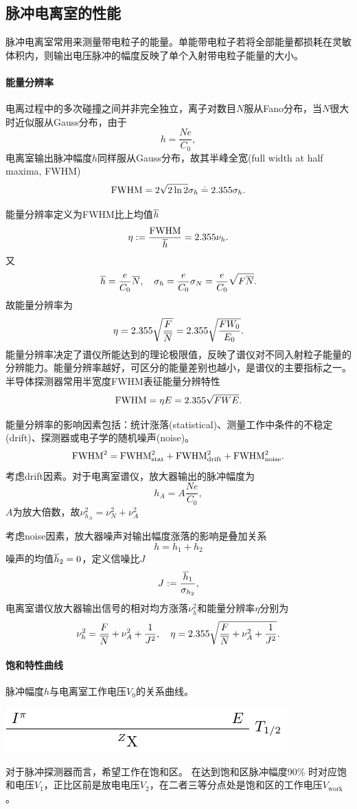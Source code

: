 \subsection{脉冲电离室的性能}

脉冲电离室常用来测量带电粒子的能量。单能带电粒子若将全部能量都损耗在灵敏体积内，则输出电压脉冲的幅度反映了单个入射带电粒子能量的大小。
\paragraph{能量分辨率}
电离过程中的多次碰撞之间并非完全独立，离子对数目$N$服从Fano分布，当$N$很大时近似服从Gauss分布，由于
\[
	h=\frac{Ne}{C_0},
\]
电离室输出脉冲幅度$h$同样服从Gauss分布，故其半峰全宽(full width at half maxima, FWHM)
\[
	\mathrm{FWHM}=2\sqrt{2\ln2}\sigma_h\doteq 2.355\sigma_h.
\]

能量分辨率定义为FWHM比上均值$\overline{h}$
\[
	\eta:=\frac{\mathrm{FWHM}}{\overline{h}}=2.355\nu_h.
\]
又
\[
	\overline{h}=\frac e{C_0}\overline{N},\quad\sigma_h=\frac e{C_0}\sigma_N=\frac e{C_0}\sqrt{F\overline{N}}.
\]
故能量分辨率为
\begin{align}
	\eta=2.355\sqrt{\frac{F}{\overline{N}}}=2.355\sqrt{\frac{FW_0}{E_0}}.
\end{align}
能量分辨率决定了谱仪所能达到的理论极限值，反映了谱仪对不同入射粒子能量的分辨能力。能量分辨率越好，可区分的能量差别也越小，是谱仪的主要指标之一。半导体探测器常用半宽度FWHM表征能量分辨特性
\[
	\mathrm{FWHM}=\eta E=2.355\sqrt{FWE}.
\]

能量分辨率的影响因素包括：统计涨落(statistical)、测量工作中条件的不稳定(drift)、探测器或电子学的随机噪声(noise)。
\[
	\mathrm{FWHM}^2=\mathrm{FWHM}_{\mathrm{stat}}^2+\mathrm{FWHM}_{\mathrm{drift}}^2+\mathrm{FWHM}_{\mathrm{noise}}^2.
\]
考虑drift因素。对于电离室谱仪，放大器输出的脉冲幅度为
\[
	h_A=A\frac{Ne}{C_0},
\]
$A$为放大倍数，故$\nu_{h_A}^2=\nu_N^2+\nu_A^2$

考虑noise因素，放大器噪声对输出幅度涨落的影响是叠加关系
\[
	h=h_1+h_2
\]
噪声的均值$\overline{h}_2=0$，定义信噪比$J$
\[
	J:=\frac{\overline{h}_1}{\sigma_{h_2}},
\]
电离室谱仪放大器输出信号的相对均方涨落$\nu_h^2$和能量分辨率$\eta$分别为
\[
	\nu_h^2=\frac F{\overline{N}}+\nu_A^2+\frac1{J^2},\quad \eta=2.355\sqrt{\frac F{\overline{N}}+\nu_A^2+\frac1{J^2}}.
\]
\paragraph{饱和特性曲线}
脉冲幅度$h$与电离室工作电压$V_0$的关系曲线。
\begin{center}
	\includegraphics[page=21]{figures/tikz/layouts.pdf}
\end{center}
对于脉冲探测器而言，希望工作在饱和区。
在达到饱和区脉冲幅度90\% 时对应饱和电压$V_1$，正比区前是放电电压$V_2$，在二者三等分点处是饱和区的工作电压$V_{\mathrm{work}}$。

